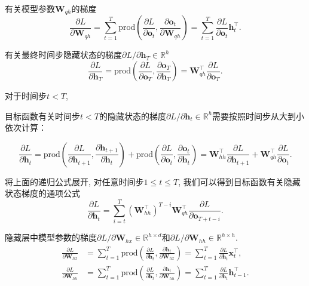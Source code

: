 有关模型参数$\mathbf{W}_{qh}$的梯度
$$
\frac{\partial L}{\partial \mathbf{W}_{qh}} 
= \sum_{t=1}^T \text{prod}\left(\frac{\partial L}{\partial \mathbf{o}_t},  \frac{\partial \mathbf{o}_t}{\partial \mathbf{W}_{qh}}\right) 
= \sum_{t=1}^T \frac{\partial L}{\partial \mathbf{o}_t} \mathbf{h}_t^\top.
$$
 
有关最终时间步隐藏状态的梯度$\partial L/\partial \mathbf{h}_T \in \mathbb{R}^h$
$$
\frac{\partial L}{\partial \mathbf{h}_T} = \text{prod}\left(\frac{\partial L}{\partial \mathbf{o}_T},  \frac{\partial \mathbf{o}_T}{\partial \mathbf{h}_T} \right) = \mathbf{W}_{qh}^\top \frac{\partial L}{\partial \mathbf{o}_T}.
$$


对于时间步$t < T$, 

目标函数有关时间步$t < T$的隐藏状态的梯度$\partial L/\partial \mathbf{h}_t \in \mathbb{R}^h$需要按照时间步从大到小依次计算：

$$
\frac{\partial L}{\partial \mathbf{h}_t}
= \text{prod}\left(\frac{\partial L}{\partial \mathbf{h}_{t+1}},  \frac{\partial \mathbf{h}_{t+1}}{\partial \mathbf{h}_t} \right)
+ \text{prod}\left(\frac{\partial L}{\partial \mathbf{o}_t},  \frac{\partial \mathbf{o}_t}{\partial \mathbf{h}_t} \right)
= \mathbf{W}_{hh}^\top \frac{\partial L}{\partial \mathbf{h}_{t+1}} + \mathbf{W}_{qh}^\top \frac{\partial L}{\partial \mathbf{o}_t}.
$$

将上面的递归公式展开, 对任意时间步$1 \leq t \leq T$, 我们可以得到目标函数有关隐藏状态梯度的通项公式
$$
\frac{\partial L}{\partial \mathbf{h}_t} 
= \sum_{i=t}^T {\left(\mathbf{W}_{hh}^\top\right)}^{T-i} \mathbf{W}_{qh}^\top \frac{\partial L}{\partial \mathbf{o}_{T+t-i}}.
$$
 
隐藏层中模型参数的梯度$\partial L / \partial \mathbf{W}_{hx} \in \mathbb{R}^{h \times d}$和$\partial L / \partial \mathbf{W}_{hh} \in \mathbb{R}^{h \times h}$. 
$$
\begin{aligned}
\frac{\partial L}{\partial \mathbf{W}_{hx}} 
&= \sum_{t=1}^T \text{prod}\left(\frac{\partial L}{\partial \mathbf{h}_t},  \frac{\partial \mathbf{h}_t}{\partial \mathbf{W}_{hx}}\right) 
= \sum_{t=1}^T \frac{\partial L}{\partial \mathbf{h}_t} \mathbf{x}_t^\top, \\
\frac{\partial L}{\partial \mathbf{W}_{hh}} 
&= \sum_{t=1}^T \text{prod}\left(\frac{\partial L}{\partial \mathbf{h}_t},  \frac{\partial \mathbf{h}_t}{\partial \mathbf{W}_{hh}}\right) 
= \sum_{t=1}^T \frac{\partial L}{\partial \mathbf{h}_t} \mathbf{h}_{t-1}^\top.
\end{aligned}
$$



